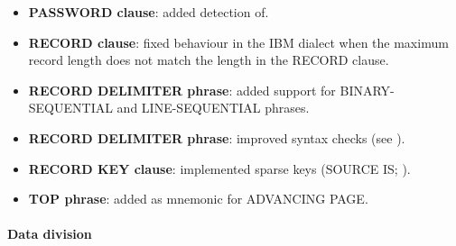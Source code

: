 \begin{itemize}
\item \textbf{PASSWORD clause}: added detection of.
\item \textbf{RECORD clause}: fixed behaviour in the IBM dialect when the maximum record length does not match the length in the RECORD clause.
\item \textbf{RECORD DELIMITER phrase}:  added support for BINARY-SEQUENTIAL and LINE-SEQUENTIAL phrases.
\item \textbf{RECORD DELIMITER phrase}: improved syntax checks (see ).
\item \textbf{RECORD KEY clause}: implemented sparse keys (SOURCE IS; ).
\item \textbf{TOP phrase}: added as mnemonic for ADVANCING PAGE.
\end{itemize}

\paragraph{Data division}

